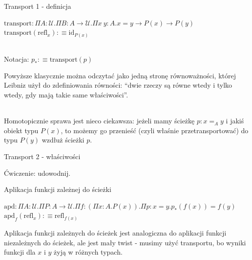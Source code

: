 \documentclass{beamer}
\newcommand{\U}{\mathcal{U}}
\newcommand{\refl}[1]{\text{refl}_{#1}}
\newcommand{\apd}[2]{\text{apd}_{#1}(#2)}
\begin{document}
\begin{frame}{Transport 1 - definicja}

\begin{definition}

$\text{transport} : \Pi A : \U. \Pi B : A \to \U. \Pi x\ y : A. x = y \to P(x) \to P(y)$ \\
$\text{transport}(\refl{x}) :\equiv \text{id}_{P(x)}$ \\~\

Notacja: $p_* :\equiv \text{transport}(p)$

\end{definition}

Powyższe klasycznie można odczytać jako jedną stronę równoważności, której Leibniz użył do zdefiniowania równości: ``dwie rzeczy są równe wtedy i tylko wtedy, gdy mają takie same właściwości''.\\~\

Homotopicznie sprawa jest nieco ciekawsza: jeżeli mamy ścieżkę $p : x =_A y$ i jakiś obiekt typu $P(x)$, to możemy go przenieść (czyli właśnie przetransportować) do typu $P(y)$ wzdłuż ścieżki $p$.

\end{frame}

\begin{frame}{Transport 2 - właściwości}


Ćwiczenie: udowodnij.

\end{frame}

\begin{frame}{Aplikacja funkcji zależnej do ścieżki}

\begin{definition}[Lemat 2.3.4]

$\text{apd} : \Pi A : \U. \Pi P : A \to \U. \Pi f : (\Pi x : A. P(x)). \Pi p : x = y. p_*(f(x)) = f(y)$ \\
$\apd{f}{\refl{x}} :\equiv \refl{f(x)}$

\end{definition}

Aplikacja funkcji zależnych do ścieżek jest analogiczna do aplikacji funkcji niezależnych do ścieżek, ale jest mały twist - musimy użyć transportu, bo wyniki funkcji dla $x$ i $y$ żyją w różnych typach.

\end{frame}
\end{document}
